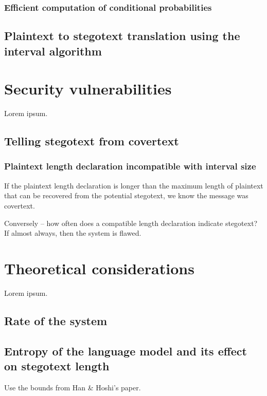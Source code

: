 \documentclass{IIBproject}
\begin{document}
\subsubsection{Efficient computation of conditional probabilities}

\subsection{Plaintext to stegotext translation using the interval algorithm}

\newpage
\section{Security vulnerabilities}

Lorem ipsum.

\subsection{Telling stegotext from covertext}

\subsubsection{Plaintext length declaration incompatible with interval size}

If the plaintext length declaration is longer than the maximum length of plaintext that can be recovered from the potential stegotext, we know the message was covertext.

Conversely -- how often does a compatible length declaration indicate stegotext? If almost always, then the system is flawed.

\newpage
\section{Theoretical considerations}

Lorem ipsum.

\subsection{Rate of the system}

\subsection{Entropy of the language model and its effect on stegotext length}

Use the bounds from Han \& Hoshi's paper.
\end{document}
